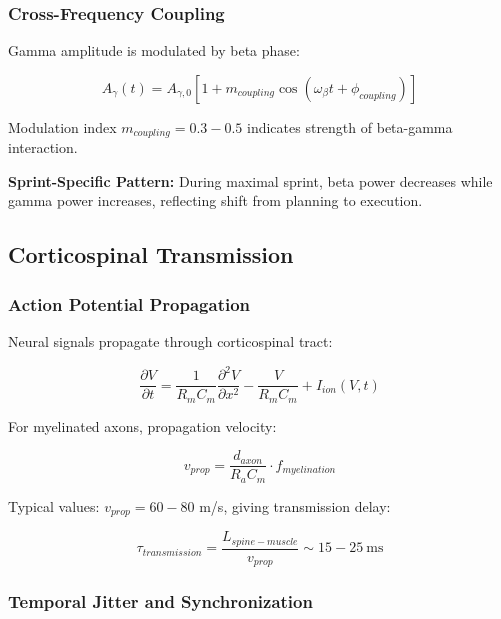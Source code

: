\subsubsection{Cross-Frequency Coupling}

Gamma amplitude is modulated by beta phase:

\begin{equation}
A_{\gamma}(t) = A_{\gamma,0} \left[1 + m_{coupling} \cos(\omega_{\beta} t + \phi_{coupling})\right]
\label{eq:cross_frequency_coupling}
\end{equation}

Modulation index $m_{coupling} = 0.3-0.5$ indicates strength of beta-gamma interaction.

\textbf{Sprint-Specific Pattern:} During maximal sprint, beta power decreases while gamma power increases, reflecting shift from planning to execution.

\subsection{Corticospinal Transmission}

\subsubsection{Action Potential Propagation}

Neural signals propagate through corticospinal tract:

\begin{equation}
\frac{\partial V}{\partial t} = \frac{1}{R_m C_m} \frac{\partial^2 V}{\partial x^2} - \frac{V}{R_m C_m} + I_{ion}(V,t)
\label{eq:cable_equation}
\end{equation}

For myelinated axons, propagation velocity:

\begin{equation}
v_{prop} = \frac{d_{axon}}{R_a C_m} \cdot f_{myelination}
\label{eq:propagation_velocity}
\end{equation}

Typical values: $v_{prop} = 60-80$ m/s, giving transmission delay:

\begin{equation}
\tau_{transmission} = \frac{L_{spine-muscle}}{v_{prop}} \sim 15-25~\text{ms}
\label{eq:transmission_delay}
\end{equation}

\subsubsection{Temporal Jitter and Synchronization}

